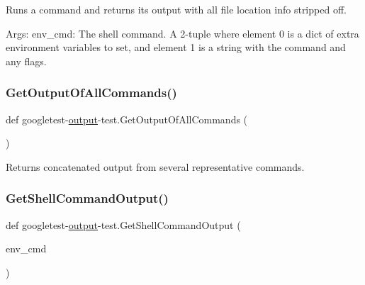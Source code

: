 \begin{DoxyVerb}Runs a command and returns its output with all file location
info stripped off.

Args:
  env_cmd:  The shell command. A 2-tuple where element 0 is a dict of extra
            environment variables to set, and element 1 is a string with
            the command and any flags.
\end{DoxyVerb}
 \mbox{\label{namespacegoogletest-output-test_a3f97b075a05d215e5f7d1c2b71973f78}} 
\subsubsection{\texorpdfstring{GetOutputOfAllCommands()}{GetOutputOfAllCommands()}}
{\footnotesize\ttfamily def googletest-\/\mbox{\hyperlink{namespacegoogletest-output-test_ab3df9ce09186215a36c30454cf282417}{output}}-\/test.\+Get\+Output\+Of\+All\+Commands (\begin{DoxyParamCaption}{ }\end{DoxyParamCaption})}

\begin{DoxyVerb}Returns concatenated output from several representative commands.\end{DoxyVerb}
 \mbox{\label{namespacegoogletest-output-test_aba640d7d1d0c51624f079baff79a04ab}} 
\subsubsection{\texorpdfstring{GetShellCommandOutput()}{GetShellCommandOutput()}}
{\footnotesize\ttfamily def googletest-\/\mbox{\hyperlink{namespacegoogletest-output-test_ab3df9ce09186215a36c30454cf282417}{output}}-\/test.\+Get\+Shell\+Command\+Output (\begin{DoxyParamCaption}\item[{}]{env\+\_\+cmd }\end{DoxyParamCaption})}

